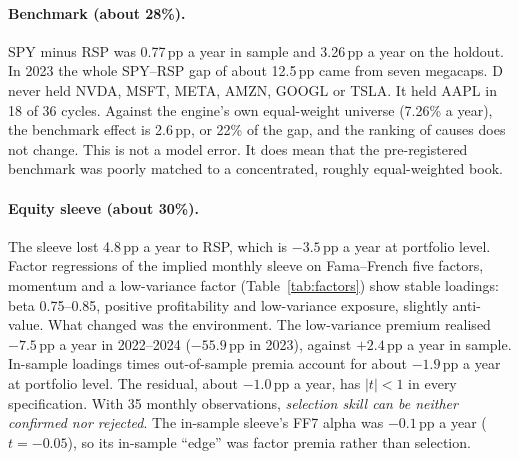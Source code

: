 \documentclass[11pt]{article}
\begin{document}
\paragraph{Benchmark (about 28\%).} SPY minus RSP was 0.77\,pp a year in sample and 3.26\,pp a year on the holdout. In 2023 the whole SPY--RSP gap of about 12.5\,pp came from seven megacaps. D never held NVDA, MSFT, META, AMZN, GOOGL or TSLA. It held AAPL in 18 of 36 cycles. Against the engine's own equal-weight universe (7.26\% a year), the benchmark effect is 2.6\,pp, or 22\% of the gap, and the ranking of causes does not change. This is not a model error. It does mean that the pre-registered benchmark was poorly matched to a concentrated, roughly equal-weighted book.

\paragraph{Equity sleeve (about 30\%).} The sleeve lost 4.8\,pp a year to RSP, which is $-3.5$\,pp a year at portfolio level. Factor regressions of the implied monthly sleeve on Fama--French five factors, momentum and a low-variance factor (Table~\ref{tab:factors}) show stable loadings: beta 0.75--0.85, positive profitability and low-variance exposure, slightly anti-value. What changed was the environment. The low-variance premium realised $-7.5$\,pp a year in 2022--2024 ($-55.9$\,pp in 2023), against $+2.4$\,pp a year in sample. In-sample loadings times out-of-sample premia account for about $-1.9$\,pp a year at portfolio level. The residual, about $-1.0$\,pp a year, has $|t|<1$ in every specification. With 35 monthly observations, \emph{selection skill can be neither confirmed nor rejected}. The in-sample sleeve's FF7 alpha was $-0.1$\,pp a year ($t=-0.05$), so its in-sample ``edge'' was factor premia rather than selection.
\end{document}
